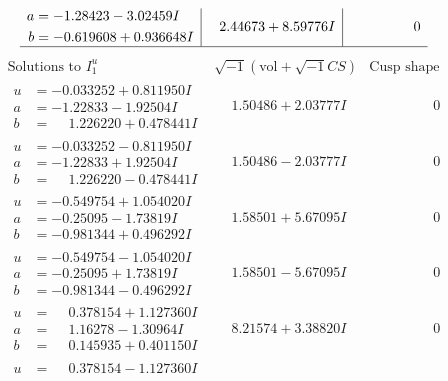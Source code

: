 \documentclass[1p]{elsarticle_modified}
\theoremstyle{definition}
\newcommand{\I}{\sqrt{-1}}
\begin{document}
$$\begin{array}{c|c|c}
\begin{aligned}
a &= -1.28423 - 3.02459 I \\
b &= -0.619608 + 0.936648 I\end{aligned}
 & \phantom{-}2.44673 + 8.59776 I & \phantom{-0.000000 } 0\\
 \hline 
 \end{array}$$\newpage$$\begin{array}{c|c|c}  
\text{Solutions to }I^u_{1}& \I (\text{vol} + \sqrt{-1}CS) & \text{Cusp shape}\\
 \hline 
\begin{aligned}
u &= -0.033252 + 0.811950 I \\
a &= -1.22833 - 1.92504 I \\
b &= \phantom{-}1.226220 + 0.478441 I\end{aligned}
 & \phantom{-}1.50486 + 2.03777 I & \phantom{-0.000000 } 0 \\ \hline\begin{aligned}
u &= -0.033252 - 0.811950 I \\
a &= -1.22833 + 1.92504 I \\
b &= \phantom{-}1.226220 - 0.478441 I\end{aligned}
 & \phantom{-}1.50486 - 2.03777 I & \phantom{-0.000000 } 0 \\ \hline\begin{aligned}
u &= -0.549754 + 1.054020 I \\
a &= -0.25095 - 1.73819 I \\
b &= -0.981344 + 0.496292 I\end{aligned}
 & \phantom{-}1.58501 + 5.67095 I & \phantom{-0.000000 } 0 \\ \hline\begin{aligned}
u &= -0.549754 - 1.054020 I \\
a &= -0.25095 + 1.73819 I \\
b &= -0.981344 - 0.496292 I\end{aligned}
 & \phantom{-}1.58501 - 5.67095 I & \phantom{-0.000000 } 0 \\ \hline\begin{aligned}
u &= \phantom{-}0.378154 + 1.127360 I \\
a &= \phantom{-}1.16278 - 1.30964 I \\
b &= \phantom{-}0.145935 + 0.401150 I\end{aligned}
 & \phantom{-}8.21574 + 3.38820 I & \phantom{-0.000000 } 0 \\ \hline\begin{aligned}
u &= \phantom{-}0.378154 - 1.127360 I \\

\end{aligned}
\end{array}$$
\end{document}
